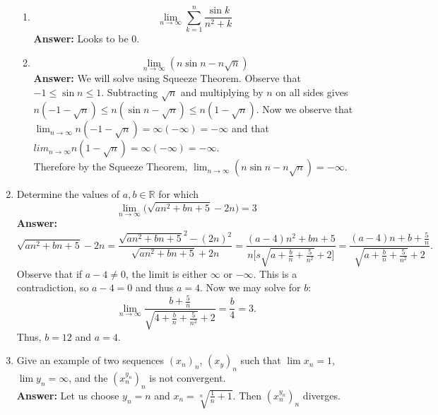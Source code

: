 \documentclass{article}
\begin{document}
\begin{enumerate}[label=\Roman*.]
\begin{enumerate}[label = \arabic*.]
            \item \[\lim_{n\to \infty} \sum_{k=1}^n \frac{\sin k}{n^2+k}\]
            \textbf{Answer: }Looks to be 0.\\
            
            \item
            \[\lim_{n\to \infty} (n\sin{n}-n\sqrt{n})\]
            \textbf{Answer: }We will solve using Squeeze Theorem. Observe that $-1 \leq \sin{n} \leq 1$. Subtracting $\sqrt{n}$ and multiplying by $n$ on all sides gives $n(-1-\sqrt{n}) \leq n(\sin{n}-\sqrt{n}) \leq n(1-\sqrt{n})$. Now we observe that $\lim_{n \to \infty} n(-1-\sqrt{n}) = \infty(-\infty) = -\infty$ and that $lim_{n \to \infty} n(1-\sqrt{n}) = \infty(-\infty) = -\infty$.\\
            Therefore by the Squeeze Theorem, $\lim_{n \to \infty} (n\sin{n} - n\sqrt{n}) = -\infty$.\\
            
            
        \end{enumerate}
        \item Determine the values of $a, b \in \mathbb{R}$ for which
            \[\lim_{n \to \infty} \Big(\sqrt{an^2+bn+5}-2n\Big) = 3\]
        \textbf{Answer: }
            \[\sqrt{an^2+bn+5}-2n = \frac{\sqrt{an^2+bn+5}^2-(2n)^2}{\sqrt{an^2+bn+5}+2n} = \frac{(a-4)n^2+bn+5}{n\Big[s\sqrt{a+\frac{b}{n}+\frac{5}{n^2}}+2\Big]} = \frac{(a-4)n+b+\frac{5}{n}}{\sqrt{a+\frac{b}{n}+\frac{5}{n^2}}+2}.\]
        Observe that if $a-4 \neq 0$, the limit is either $\infty$ or $-\infty$. This is a contradiction, so $a-4 = 0$ and thus $a=4$. Now we may solve for $b$:
            \[\lim_{n \to \infty} \frac{b+\frac{5}{n}}{\sqrt{4+\frac{b}{n}+\frac{5}{n^2}}+2} = \frac{b}{4} = 3.\]
        Thus, $b = 12$ and $a=4$.\\
        \item Give an example of two sequences $(x_n)_n$, $(x_y)_n$ such that $\lim x_n = 1$, $\lim y_n = \infty$, and the $(x_n ^ {y_n})_n$ is not convergent.\\
        \textbf{Answer: }Let us choose $y_n = n$ and $x_n = \sqrt[n]{\frac{1}{n}+1}$. Then $(x_n^{y_n})_n$ diverges.
        
    \end{enumerate}
\end{document}
